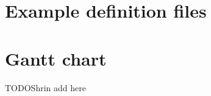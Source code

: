 \documentclass[a4paper,11pt]{article}
\numberwithin{equation}{section}
\begin{document}
\section{Example definition files}


\begin{appendices} \label{app}
	\section{Gantt chart}
	{\huge TODO}Shrin add here
\end{appendices}
\end{document}

